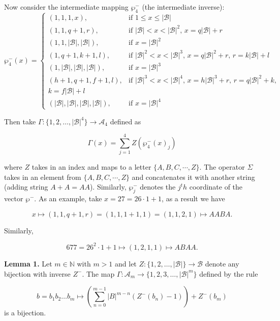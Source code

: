 \documentclass[amsmath,12pt,a4paper]{amsart}
\begin{document}
Now consider the intermediate mapping $\wp^{-}_4$ (the intermediate inverse):
$$
\wp^{-}_4(x) =
\begin{cases}
(1, 1, 1, x), & \text{if } 1 \leq x \leq |\mathcal{B}| \\
(1, 1, q + 1, r), & \text{if } |\mathcal{B}| < x < |\mathcal{B}|^2, \, x = q|\mathcal{B}| + r \\
(1, 1, |\mathcal{B}|, |\mathcal{B}|), & \text{if } x = |\mathcal{B}|^2 \\
(1, q + 1, k + 1, l), & \text{if } |\mathcal{B}|^2 < x < |\mathcal{B}|^3, \, x = q|\mathcal{B}|^2 + r, \, r = k|\mathcal{B}| + l \\
(1, |\mathcal{B}|, |\mathcal{B}|, |\mathcal{B}|), & \text{if } x = |\mathcal{B}|^3 \\
(h + 1, q + 1, f + 1, l), & \text{if } |\mathcal{B}|^3 < x < |\mathcal{B}|^4, \, x = h|\mathcal{B}|^3 + r, \, r = q|\mathcal{B}|^2 + k, \\
k = f|\mathcal{B}| + l \\
(|\mathcal{B}|, |\mathcal{B}|, |\mathcal{B}|, |\mathcal{B}|), & \text{if } x = |\mathcal{B}|^4
\end{cases}
$$

Then take $\Gamma : \{1, 2, \ldots, |\mathcal{B}|^4\} \to \mathcal{A}_4$ defined as

$$
\Gamma(x) = \sum_{j=1}^{4}{ Z(\wp^{-}_4(x)_j)}
$$

where $Z$ takes in an index and maps to a letter $\{A, B, C, \cdots, Z\}$. The operator $\Sigma$ takes in an element from $\{A, B, C, \cdots, Z\}$ and concatenates it with another string (adding string $A + A = AA$). Similarly, $\wp^{-}_j$ denotes the $j^th$ coordinate of the vector $\wp^{-}$. As an example, take $x = 27 = 26 \cdot 1 + 1$, as a result we have

$$
x \mapsto (1, 1, q + 1, r) = (1, 1, 1 + 1, 1) = (1, 1, 2, 1) \mapsto AABA.
$$

Similarly,

$$
677 = 26^2 \cdot 1 + 1 \mapsto (1, 2, 1, 1) \mapsto ABAA.
$$

\textbf{Lemma 1.} Let $m \in \mathbb{N}$ with $m > 1$ and let $Z : \{1, 2, \ldots, |\mathcal{B}|\} \to \mathcal{B}$ denote any bijection with inverse $Z^{-}$. The map $\Gamma : \mathcal{A}_m \to \{1, 2, 3, \ldots, |\mathcal{B}|^m\}$ defined by the rule

$$
b = b_1b_2 \ldots b_m \mapsto \left( \sum_{n=0}^{m-1} |B|^{m-n} \left( Z^{-}(b_n) - 1 \right) \right) + Z^{-}(b_m)
$$
is a bijection.\\
\end{document}
